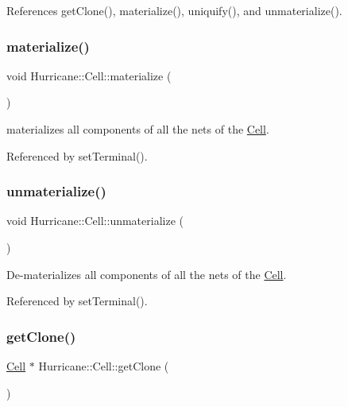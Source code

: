 References get\+Clone(), materialize(), uniquify(), and unmaterialize().

\mbox{\label{classHurricane_1_1Cell_affefc597317063857f4904d4b16d5d4f}} 
\subsubsection{\texorpdfstring{materialize()}{materialize()}}
{\footnotesize\ttfamily void Hurricane\+::\+Cell\+::materialize (\begin{DoxyParamCaption}{ }\end{DoxyParamCaption})}

materializes all components of all the nets of the \hyperlink{classHurricane_1_1Cell}{Cell}. 

Referenced by set\+Terminal().

\mbox{\label{classHurricane_1_1Cell_a40c9ba4e3fc76b0c4bc58af8dcaddf53}} 
\subsubsection{\texorpdfstring{unmaterialize()}{unmaterialize()}}
{\footnotesize\ttfamily void Hurricane\+::\+Cell\+::unmaterialize (\begin{DoxyParamCaption}{ }\end{DoxyParamCaption})}

De-\/materializes all components of all the nets of the \hyperlink{classHurricane_1_1Cell}{Cell}. 

Referenced by set\+Terminal().

\mbox{\label{classHurricane_1_1Cell_a092f53c7f517ecc70d9ba375296c5d5b}} 
\subsubsection{\texorpdfstring{get\+Clone()}{getClone()}}
{\footnotesize\ttfamily \hyperlink{classHurricane_1_1Cell}{Cell} $\ast$ Hurricane\+::\+Cell\+::get\+Clone (\begin{DoxyParamCaption}{ }\end{DoxyParamCaption})}

